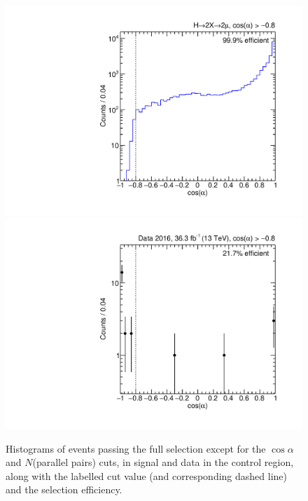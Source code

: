 \begin{figure}[p]
  \centering
  \includegraphics[width=\DSquareWidth]{figures/displaced/NM1_2Mu2J_cosAlpha.pdf}
  \hspace*{-2em}
  \includegraphics[width=\DSquareWidth]{figures/displaced/NM1_Data_cosAlpha.pdf}
  \caption[Histograms of events passing the full selection except for the $\cos{\alpha}$ and $N$(parallel pairs) cuts in \twoMu signal and data.]{Histograms of events passing the full selection except for the $\cos{\alpha}$ and $N$(parallel pairs) cuts, in  \twoMu signal and  data in the control region, along with the labelled cut value (and corresponding dashed line) and the selection efficiency.}
  \label{fig:dd:NM1_cosAlpha}
\end{figure}

